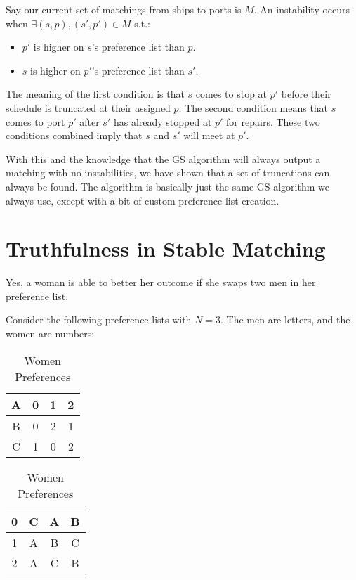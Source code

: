 \documentclass[12pt]{article}
\begin{document}
Say our current set of matchings from ships to ports is $M$.
An instability occurs when $\exists (s, p), (s', p') \in M$ s.t.:
\begin{itemize}
    \item $p'$ is higher on $s$'s preference list than $p$.
    \item $s$ is higher on $p'$'s preference list than $s'$.
\end{itemize}
The meaning of the first condition is that $s$ comes to stop at $p'$
before their schedule is truncated at their assigned $p$.
The second condition means that $s$ comes to port $p'$ after $s'$
has already stopped at $p'$ for repairs.
These two conditions combined imply that $s$ and $s'$ will meet at $p'$.

With this and the knowledge that the GS algorithm will always output a matching
with no instabilities, we have shown that a set of truncations can always be found.
The algorithm is basically just the same GS algorithm we always use,
except with a bit of custom preference list creation.

\pagebreak

\section{Truthfulness in Stable Matching}

Yes, a woman is able to better her outcome if she swaps two men in her preference list.

Consider the following preference lists with $N=3$.
The men are letters, and the women are numbers:

\begin{table}[H]
    \parbox{.45\linewidth}{
        \centering
        \begin{tabular}{|c|c|c|c|}
            \hline
            A & 0 & 1 & 2 \\
            \hline
            B & 0 & 2 & 1 \\
            \hline
            C & 1 & 0 & 2 \\
            \hline
        \end{tabular}
        \caption{Men Preferences}
    }
    \hfill
    \parbox{.45\linewidth}{
        \centering
        \begin{tabular}{|c|c|c|c|}
            \hline
            0 & C & A & B \\
            \hline
            1 & A & B & C \\
            \hline
            2 & A & C & B \\
            \hline
        \end{tabular}
        \caption{Women Preferences}
    }
\end{table}
\end{document}
